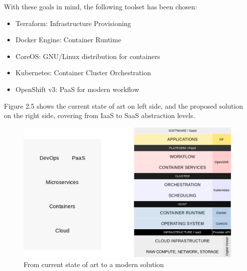 With these goals in mind, the following toolset has been chosen:

\begin{itemize}
\item Terraform: Infrastructure Provisioning
\item Docker Engine: Container Runtime
\item CoreOS: GNU/Linux distribution for containers
\item Kubernetes: Container Cluster Orchestration
\item OpenShift v3: PaaS for modern workflow
\end{itemize}

Figure 2.5 shows the current state of art on left side, and the proposed solution on the right side, covering from IaaS to SaaS abstraction levels.

\begin{figure}[htbp]
\centering
\includegraphics{media/ch2-solution.png}
\caption{From current state of art to a modern solution}
\end{figure}